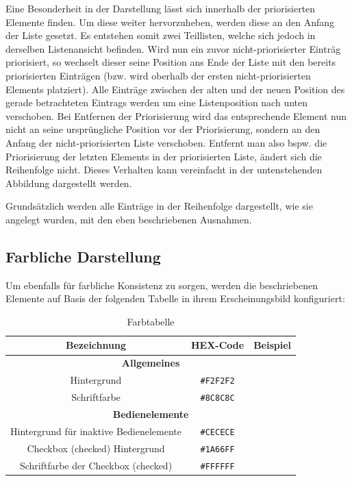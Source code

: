 Eine Besonderheit in der Darstellung lässt sich innerhalb der priorisierten Elemente finden. Um diese weiter hervorzuheben, werden diese an den Anfang der Liste gesetzt. Es entstehen somit zwei Teillisten, welche sich jedoch in derselben Listenansicht befinden. Wird nun ein zuvor nicht-priorisierter Einträg priorisiert, so wechselt dieser seine Position ans Ende der Liste mit den bereits priorisierten Einträgen (bzw. wird oberhalb der ersten nicht-priorisierten Elements platziert). Alle Einträge zwischen der alten und der neuen Position des gerade betrachteten Eintrags werden um eine Listenposition nach unten verschoben. Bei Entfernen der Priorisierung wird das entsprechende Element nun nicht an seine ursprüngliche Position vor der Priorisierung, sondern an den Anfang der nicht-priorisierten Liste verschoben. Entfernt man also bspw. die Priorisierung der letzten Elements in der priorisierten Liste, ändert sich die Reihenfolge nicht. Dieses Verhalten kann vereinfacht in der untenstehenden Abbildung dargestellt werden.

Grundsätzlich werden alle Einträge in der Reihenfolge dargestellt, wie sie angelegt wurden, mit den eben beschriebenen Ausnahmen.


\subsection{Farbliche Darstellung}
Um ebenfalls für farbliche Konsistenz zu sorgen, werden die beschriebenen Elemente auf Basis der folgenden Tabelle in ihrem Erscheinungsbild konfiguriert:

\begin{table}[h!]
	\centering
	\begin{tabular}{ |c|c|c|}
		\hline
		\textbf{Bezeichnung} & \textbf{HEX-Code} & \textbf{Beispiel}\\
		\hline
		
		
		\hline
		\multicolumn{3}{|c|}{\textbf{Allgemeines}}\\
		\hline
		Hintergrund & \texttt{\#F2F2F2} &\cellcolor[HTML]{F2F2F2}\\
		\hline
		Schriftfarbe & \texttt{\#8C8C8C} &\cellcolor[HTML]{8C8C8C}\\
		\hline
		
		
		\hline
		\multicolumn{3}{|c|}{\textbf{Bedienelemente}}\\
		\hline
		Hintergrund für inaktive Bedienelemente & \texttt{\#CECECE} &\cellcolor[HTML]{CECECE}\\
		\hline
		Checkbox (checked) Hintergrund & \texttt{\#1A66FF} &\cellcolor[HTML]{1A66FF}\\
		\hline
		Schriftfarbe der Checkbox (checked) & \texttt{\#FFFFFF} &\cellcolor[HTML]{FFFFFF}\\
		\hline
	\end{tabular}
	\caption{Farbtabelle} \label{tab:farbtabelle}
\end{table}
